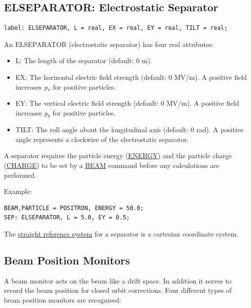 

%
\subsection{ELSEPARATOR: Electrostatic Separator}
\label{sec:separator}

\begin{verbatim}
label: ELSEPARATOR, L = real, EX = real, EY = real, TILT = real;
\end{verbatim} 

An ELSEPARATOR (electrostatic separator) has four real attributes: 
\begin{itemize}
   \item L: The length of the separator (default: 0 m). 
   \item EX: The horizontal electric field strength (default: 0 MV/m). 
     A positive field increases \textit{p$_x$} for positive particles.  
   \item EY: The vertical electric field strength (default: 0 MV/m). 
     A positive field increases \textit{p$_y$} for positive particles.  
   \item TILT: The roll angle about the longitudinal axis (default: 0
     rad). A positive angle represents a clockwise of the electrostatic
     separator.  
\end{itemize} 

A separator requires the particle energy
(\href{beam.html#energy}{ENERGY}) and the particle charge
(\href{beam.html#charge}{CHARGE}) to be set by a \href{beam.html}{BEAM}
command before any calculations are performed.  

Example: 
\begin{verbatim}
BEAM,PARTICLE = POSITRON, ENERGY = 50.0;
SEP: ELSEPARATOR, L = 5.0, EY = 0.5;
\end{verbatim} 

The \href{local_system.html#straight}{straight reference system} for a
separator is a cartesian coordinate system.   


%
\subsection{Beam Position Monitors}
\label{sec:monitors}

A beam monitor acts on the beam like a drift space. In addition it
serves to record the beam position for closed orbit corrections. Four
different types of beam position monitors are recognised:  

